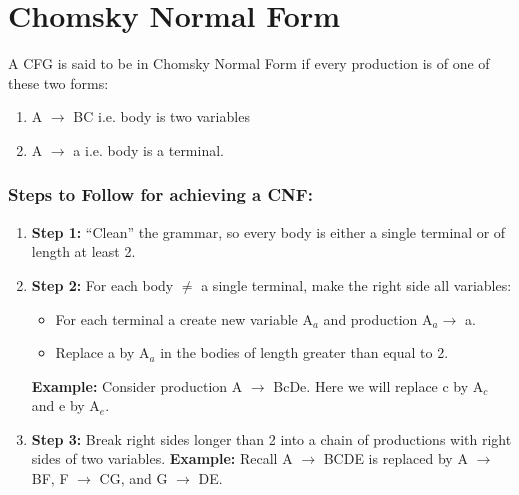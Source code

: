 \documentclass{report}
\begin{document}
\section{Chomsky Normal Form}
A CFG is said to be in Chomsky Normal Form if every production is of one of these two forms:
\begin{enumerate}
    \item A $\rightarrow$ BC i.e. body is two variables
    \item A $\rightarrow$ a i.e. body is a terminal.
\end{enumerate}
\subsubsection{Steps to Follow for achieving a CNF:}
\begin{enumerate}
    \item \textbf{Step 1:}  “Clean” the grammar, so every body is either a single terminal or of length at least 2.
    \item \textbf{Step 2:}  For each body $\neq$ a single terminal, make the right side all variables:
    \begin{itemize}
        \item For each terminal a create new variable A$_a$ and production A$_a\rightarrow$ a.
        \item Replace a by A$_a$ in the bodies of length greater than equal to 2.
    \end{itemize}
    \textbf{Example:} Consider production A $\rightarrow$ BcDe. Here we will replace c by A$_c$ and e by A$_e$.
    \item \textbf{Step 3:} Break right sides longer than 2 into a chain of productions with right sides of two variables. \textbf{Example:} Recall A $\rightarrow$ BCDE is replaced by A $\rightarrow$ BF, F $\rightarrow$ CG, and G $\rightarrow$ DE.
\end{enumerate}
\end{document}
